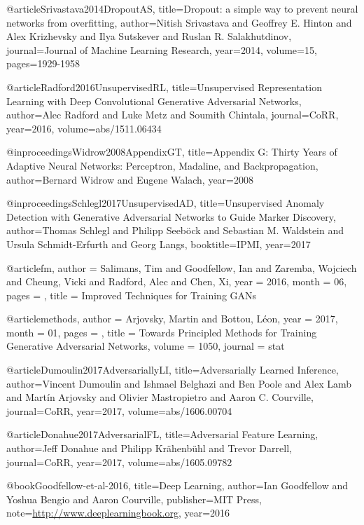 @article{Srivastava2014DropoutAS,
  title={Dropout: a simple way to prevent neural networks from overfitting},
  author={Nitish Srivastava and Geoffrey E. Hinton and Alex Krizhevsky and Ilya Sutskever and Ruslan R. Salakhutdinov},
  journal={Journal of Machine Learning Research},
  year={2014},
  volume={15},
  pages={1929-1958}
}

@article{Radford2016UnsupervisedRL,
  title={Unsupervised Representation Learning with Deep Convolutional Generative Adversarial Networks},
  author={Alec Radford and Luke Metz and Soumith Chintala},
  journal={CoRR},
  year={2016},
  volume={abs/1511.06434}
}

@inproceedings{Widrow2008AppendixGT,
  title={Appendix G: Thirty Years of Adaptive Neural Networks: Perceptron, Madaline, and Backpropagation},
  author={Bernard Widrow and Eugene Walach},
  year={2008}
}

@inproceedings{Schlegl2017UnsupervisedAD,
  title={Unsupervised Anomaly Detection with Generative Adversarial Networks to Guide Marker Discovery},
  author={Thomas Schlegl and Philipp Seeb{\"o}ck and Sebastian M. Waldstein and Ursula Schmidt-Erfurth and Georg Langs},
  booktitle={IPMI},
  year={2017}
}

@article{fm,
author = {Salimans, Tim and Goodfellow, Ian and Zaremba, Wojciech and Cheung, Vicki and Radford, Alec and Chen, Xi},
year = {2016},
month = {06},
pages = {},
title = {Improved Techniques for Training GANs}
}


@article{methods,
author = {Arjovsky, Martin and Bottou, Léon},
year = {2017},
month = {01},
pages = {},
title = {Towards Principled Methods for Training Generative Adversarial Networks},
volume = {1050},
journal = {stat}
}

@article{Dumoulin2017AdversariallyLI,
  title={Adversarially Learned Inference},
  author={Vincent Dumoulin and Ishmael Belghazi and Ben Poole and Alex Lamb and Mart{\'i}n Arjovsky and Olivier Mastropietro and Aaron C. Courville},
  journal={CoRR},
  year={2017},
  volume={abs/1606.00704}
}


@article{Donahue2017AdversarialFL,
  title={Adversarial Feature Learning},
  author={Jeff Donahue and Philipp Kr{\"a}henb{\"u}hl and Trevor Darrell},
  journal={CoRR},
  year={2017},
  volume={abs/1605.09782}
}

@book{Goodfellow-et-al-2016,
    title={Deep Learning},
    author={Ian Goodfellow and Yoshua Bengio and Aaron Courville},
    publisher={MIT Press},
    note={\url{http://www.deeplearningbook.org}},
    year={2016}
}

